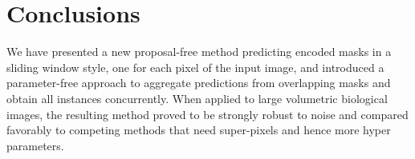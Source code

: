 
\section{Conclusions}
We have presented a new proposal-free method predicting encoded \maskname masks in a sliding window style, one for each pixel of the input image, and introduced a parameter-free approach to aggregate predictions from overlapping masks and obtain all instances concurrently.
When applied to large volumetric biological images, the resulting method proved to be strongly robust to noise and compared favorably to competing methods that need super-pixels and hence more hyper parameters.

